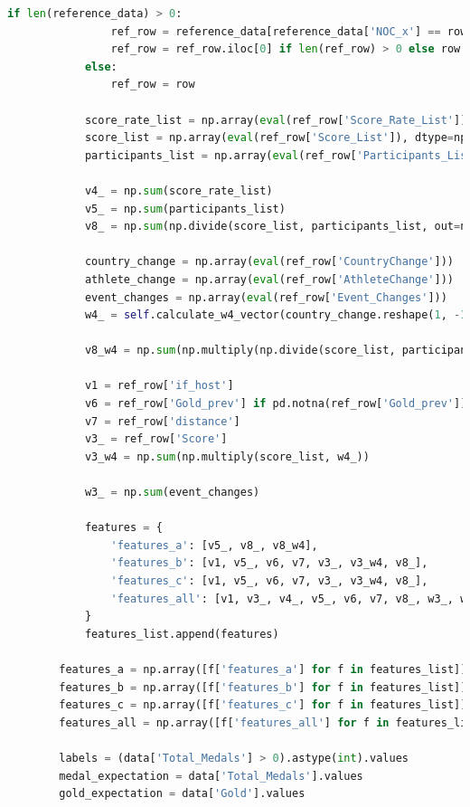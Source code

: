\documentclass[12pt]{article}
\begin{document}
\begin{lstlisting}[language=Python, style=mystyle, caption=model.ipynb]
            if len(reference_data) > 0:
                ref_row = reference_data[reference_data['NOC_x'] == row['NOC_x']]
                ref_row = ref_row.iloc[0] if len(ref_row) > 0 else row
            else:
                ref_row = row

            score_rate_list = np.array(eval(ref_row['Score_Rate_List']))
            score_list = np.array(eval(ref_row['Score_List']), dtype=np.float64)
            participants_list = np.array(eval(ref_row['Participants_List']), dtype=np.float64)

            v4_ = np.sum(score_rate_list)
            v5_ = np.sum(participants_list)
            v8_ = np.sum(np.divide(score_list, participants_list, out=np.zeros_like(score_list, dtype=np.float64), where=participants_list > 0))

            country_change = np.array(eval(ref_row['CountryChange']))
            athlete_change = np.array(eval(ref_row['AthleteChange']))
            event_changes = np.array(eval(ref_row['Event_Changes']))
            w4_ = self.calculate_w4_vector(country_change.reshape(1, -1), athlete_change.reshape(1, -1), event_changes.reshape(1, -1))[0]

            v8_w4 = np.sum(np.multiply(np.divide(score_list, participants_list, out=np.zeros_like(score_list, dtype=np.float64), where=participants_list > 0), w4_))

            v1 = ref_row['if_host']
            v6 = ref_row['Gold_prev'] if pd.notna(ref_row['Gold_prev']) else 0
            v7 = ref_row['distance']
            v3_ = ref_row['Score']
            v3_w4 = np.sum(np.multiply(score_list, w4_))

            w3_ = np.sum(event_changes)

            features = {
                'features_a': [v5_, v8_, v8_w4],
                'features_b': [v1, v5_, v6, v7, v3_, v3_w4, v8_],
                'features_c': [v1, v5_, v6, v7, v3_, v3_w4, v8_],
                'features_all': [v1, v3_, v4_, v5_, v6, v7, v8_, w3_, w4_]
            }
            features_list.append(features)

        features_a = np.array([f['features_a'] for f in features_list])
        features_b = np.array([f['features_b'] for f in features_list])
        features_c = np.array([f['features_c'] for f in features_list])
        features_all = np.array([f['features_all'] for f in features_list])

        labels = (data['Total_Medals'] > 0).astype(int).values
        medal_expectation = data['Total_Medals'].values
        gold_expectation = data['Gold'].values


\end{lstlisting}
\end{document}
